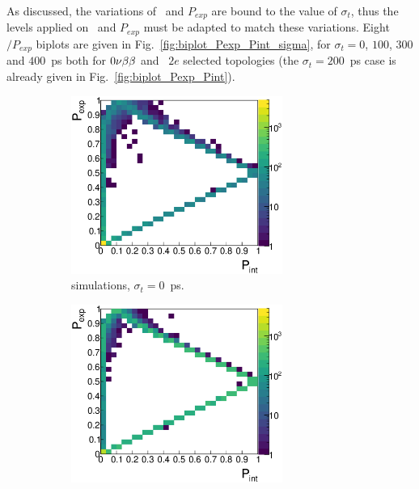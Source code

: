 As discussed, the variations of \Pint\ and $P_{exp}$ are bound to the value of $\sigma_{t}$, thus the levels applied on \Pint\ and $P_{exp}$ must be adapted to match these variations.
Eight \Pint$/P_{exp}$ biplots are given in Fig.~\ref{fig:biplot_Pexp_Pint_sigma}, for $\sigma_{t}=0$, $100$, $300$ and $400$~ps both for $0\nu\beta\beta$ and \Tl\ $2e$ selected topologies (the ${\sigma_{t}=200}$~ps case is already given in Fig.~\ref{fig:biplot_Pexp_Pint}).
\begin{figure}[!h]
\centering
\begin{subfigure}[t]{0.49\textwidth}
  \centering
  \includegraphics[width=0.76\textwidth]{timedifference/fig_timediff/PintVSPexp_208Tl_0.eps}
  \captionsetup{justification=justified}
  \caption{\Tl simulations, ${\sigma_{t}=0}$~ps.
    \label{subfig:}}
\end{subfigure}
\hfill
\begin{subfigure}[t]{0.49\textwidth}
  \centering
  \includegraphics[width=0.76\textwidth]{timedifference/fig_timediff/PintVSPexp_0nubb_0.eps}

\end{subfigure}
\end{figure}

